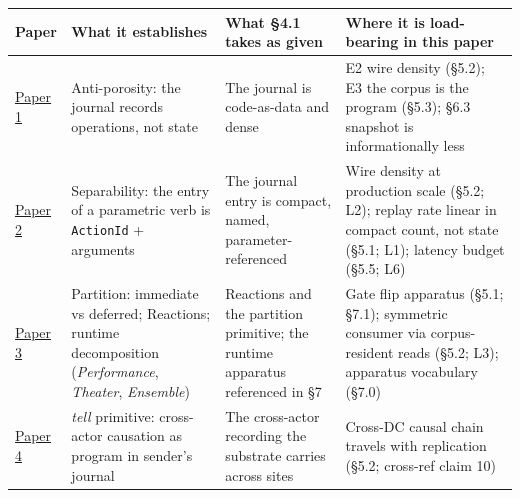 \documentclass[
]{article}
\newcounter{none} %
\begin{document}
{\def\LTcaptype{none} %
\begin{longtable}[]{@{}
  >{\raggedright\arraybackslash}p{}
  >{\raggedright\arraybackslash}p{}
  >{\raggedright\arraybackslash}p{}
  >{\raggedright\arraybackslash}p{}@{}}
\toprule\noalign{}
\begin{minipage}[b]{\linewidth}\raggedright
Paper
\end{minipage} & \begin{minipage}[b]{\linewidth}\raggedright
What it establishes
\end{minipage} & \begin{minipage}[b]{\linewidth}\raggedright
What §4.1 takes as given
\end{minipage} & \begin{minipage}[b]{\linewidth}\raggedright
Where it is load-bearing in this paper
\end{minipage} \\
\midrule\noalign{}
\endhead
\bottomrule\noalign{}
\endlastfoot
\href{01-anti-porosity.md}{Paper 1} & Anti-porosity: the journal records
operations, not state & The journal is code-as-data and dense & E2 wire
density (§5.2); E3 the corpus is the program (§5.3); §6.3 snapshot is
informationally less \\
\href{02-program-value-separability.md}{Paper 2} & Separability: the
entry of a parametric verb is \texttt{ActionId} + arguments & The
journal entry is compact, named, parameter-referenced & Wire density at
production scale (§5.2; L2); replay rate linear in compact count, not
state (§5.1; L1); latency budget (§5.5; L6) \\
\href{03-reactions-and-partition.md}{Paper 3} & Partition: immediate vs
deferred; Reactions; runtime decomposition (\emph{Performance},
\emph{Theater}, \emph{Ensemble}) & Reactions and the partition
primitive; the runtime apparatus referenced in §7 & Gate flip apparatus
(§5.1; §7.1); symmetric consumer via corpus-resident reads (§5.2; L3);
apparatus vocabulary (§7.0) \\
\href{04-cross-actor-continuity.md}{Paper 4} & \emph{tell} primitive:
cross-actor causation as program in sender's journal & The cross-actor
recording the substrate carries across sites & Cross-DC causal chain
travels with replication (§5.2; cross-ref claim 10) \\
\end{longtable}
}
\end{document}
